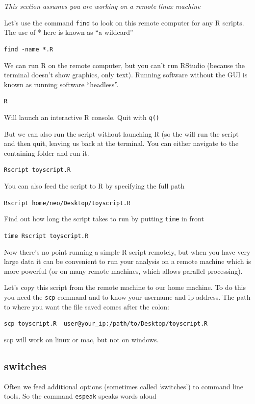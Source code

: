 \documentclass[
  12pt,
  a5paper,
]{book}
\begin{document}
\emph{This section assumes you are working on a remote linux machine}

Let's use the command \texttt{find} to look on this remote computer for any R scripts. The use of * here is known as ``a wildcard''

\texttt{find\ -name\ \textquotesingle{}*.R\textquotesingle{}}

We can run R on the remote computer, but you can't run RStudio (because the terminal doesn't show graphics, only text). Running software without the GUI is known as running software ``headless''.

\texttt{R}

Will launch an interactive R console. Quit with \texttt{q()}

But we can also run the script without launching R (so the will run the script and then quit, leaving us back at the terminal. You can either navigate to the containing folder and run it.

\texttt{Rscript\ toyscript.R}

You can also feed the script to R by specifying the full path

\texttt{Rscript\ home/neo/Desktop/toyscript.R}

Find out how long the script takes to run by putting \texttt{time} in front

\texttt{time\ Rscript\ toyscript.R}

Now there's no point running a simple R script remotely, but when you have very large data it can be convenient to run your analysis on a remote machine which is more powerful (or on many remote machines, which allows parallel processing).

Let's copy this script from the remote machine to our home machine. To do this you need the \texttt{scp} command and to know your username and ip address. The path to where you want the file saved comes after the colon:

\texttt{scp\ toyscript.R\ \ user@your\_ip:/path/to/Desktop/toyscript.R}

scp will work on linux or mac, but not on windows.

\hypertarget{switches}{%
\subsection{switches}\label{switches}}

Often we feed additional options (sometimes called `switches') to command line tools. So the command \texttt{espeak} speaks words aloud
\end{document}
